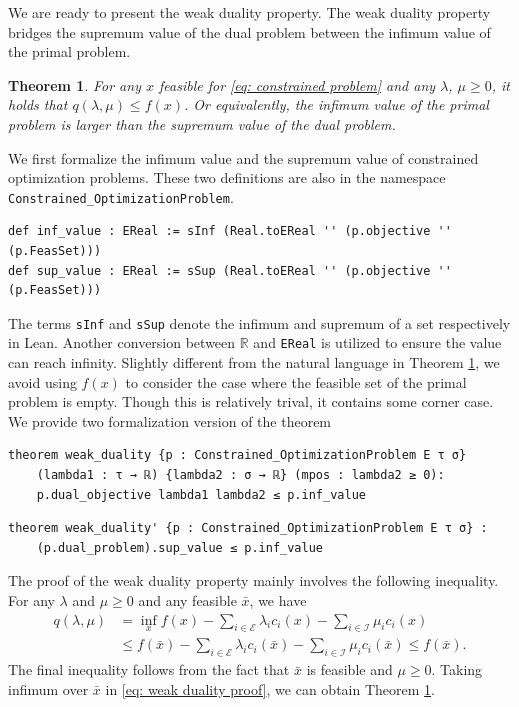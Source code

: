 \documentclass[sn-mathphys]{JORSC-jnl}%
\theoremstyle{thmstyleone}%
\newtheorem{theorem}{Theorem}%
\theoremstyle{thmstylethree}%
\newcommand{\lean}[1]{\lstinline[language=lean, mathescape=true]{#1}}
\begin{document}
We are ready to present the weak duality property. The weak duality property bridges the supremum value of the dual problem between the infimum value of the primal problem.
\begin{theorem}\label{thm: weak duality}
    For any $x$ feasible for \eqref{eq: constrained problem} and any $\lambda$, $\mu \geq 0$, it holds that $q(\lambda, \mu) \leq f(x)$. Or equivalently, the infimum value of the primal problem is larger than the supremum value of the dual problem.
\end{theorem}
We first formalize the infimum value and the supremum value of constrained optimization problems. These two definitions are also in the namespace \lean{Constrained_OptimizationProblem}.
\begin{lstlisting}
def inf_value : EReal := sInf (Real.toEReal '' (p.objective '' (p.FeasSet)))
def sup_value : EReal := sSup (Real.toEReal '' (p.objective '' (p.FeasSet)))
\end{lstlisting}
The terms \lean{sInf} and \lean{sSup} denote the infimum and supremum of a set respectively in Lean. Another conversion between $\mathbb{R}$ and \lean{EReal} is utilized to ensure the value can reach infinity. Slightly different from the natural language in Theorem \ref{thm: weak duality}, we avoid using $f(x)$ to consider the case where the feasible set of the primal problem is empty. Though this is relatively trival, it contains some corner case. We provide two formalization version of the theorem
\begin{lstlisting}
theorem weak_duality {p : Constrained_OptimizationProblem E τ σ}
    (lambda1 : τ → ℝ) {lambda2 : σ → ℝ} (mpos : lambda2 ≥ 0):
    p.dual_objective lambda1 lambda2 ≤ p.inf_value 
\end{lstlisting}

\begin{lstlisting}
theorem weak_duality' {p : Constrained_OptimizationProblem E τ σ} :
    (p.dual_problem).sup_value ≤ p.inf_value 
\end{lstlisting}
The proof of the weak duality property mainly involves the following inequality. For any $\lambda$ and $\mu \geq 0$ and any feasible $\bar{x}$, we have 
\begin{align}\label{eq: weak duality proof}
    q(\lambda, \mu) &= \inf\limits_x f(x) - \sum_{i \in \mathcal{E}} \lambda_i c_i(x) - \sum_{i \in \mathcal{I}} \mu_i c_i(x) 
     \\ &\leq  f(\bar{x}) - \sum_{i \in \mathcal{E}} \lambda_i c_i(\bar{x}) - \sum_{i \in \mathcal{I}} \mu_i c_i(\bar{x}) \leq f(\bar{x}).
\end{align}
The final inequality follows from the fact that $\bar{x}$ is feasible and $\mu \geq 0$. Taking infimum over $\bar{x}$ in \eqref{eq: weak duality proof}, we can obtain Theorem \ref{thm: weak duality}.
\end{document}
